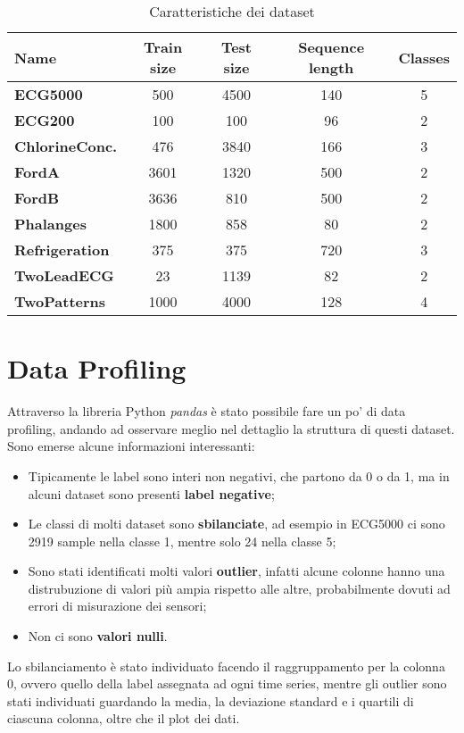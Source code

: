 \begin{table}[H]
	\centering
	\begin{tabularx}{\textwidth}{X c c c c}
		\hline
		\textbf{Name} & \textbf{Train size} & \textbf{Test size} & \textbf{Sequence length} & \textbf{Classes} \\
		\hline
		\textbf{ECG5000} & 500 & 4500 & 140 & 5\\
		\textbf{ECG200} & 100 & 100 & 96 & 2\\
		\textbf{ChlorineConc.} & 476 & 3840 & 166 & 3\\
		\textbf{FordA} & 3601 & 1320 & 500 & 2\\
		\textbf{FordB} & 3636 & 810 & 500 & 2\\
		\textbf{Phalanges} & 1800 & 858 & 80 & 2\\
		\textbf{Refrigeration} & 375 & 375 & 720 & 3\\
		\textbf{TwoLeadECG} & 23 & 1139 & 82 & 2\\
		\textbf{TwoPatterns} & 1000 & 4000 & 128 & 4\\
	\end{tabularx}
	\caption{Caratteristiche dei dataset}
	\label{tab:datasets}
\end{table}

\section{Data Profiling}
Attraverso la libreria Python \textit{pandas} è stato possibile fare un po' di data profiling, andando ad osservare meglio nel dettaglio la struttura di questi dataset.\\
Sono emerse alcune informazioni interessanti:
\begin{itemize}
	\item Tipicamente le label sono interi non negativi, che partono da 0 o da 1, ma in alcuni dataset sono presenti \textbf{label negative};
	\item Le classi di molti dataset sono \textbf{sbilanciate}, ad esempio in ECG5000 ci sono 2919 sample nella classe 1, mentre solo 24 nella classe 5;
	\item Sono stati identificati molti valori \textbf{outlier}, infatti alcune colonne hanno una distrubuzione di valori più ampia rispetto alle altre, probabilmente dovuti ad errori di misurazione dei sensori;
	\item Non ci sono \textbf{valori nulli}.
\end{itemize}
Lo sbilanciamento è stato individuato facendo il raggruppamento per la colonna 0, ovvero quello della label assegnata ad ogni time series, mentre gli outlier sono stati individuati guardando la media, la deviazione standard e i quartili di ciascuna colonna, oltre che il plot dei dati.\\

